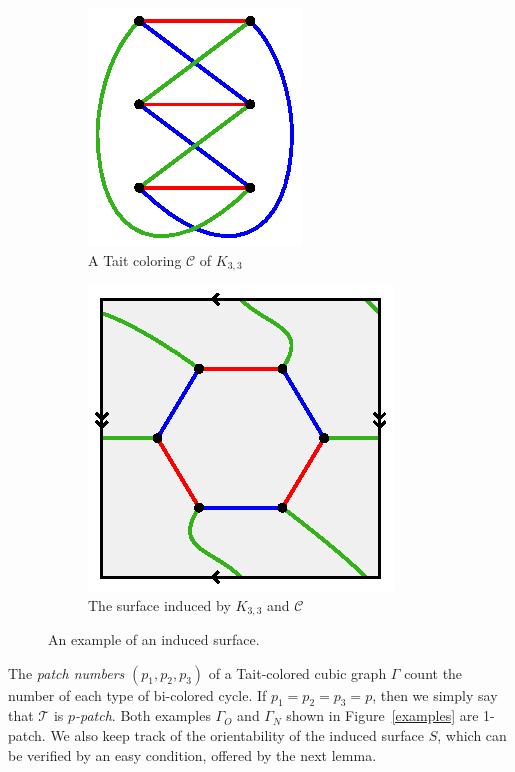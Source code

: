 \documentclass[11pt, oneside]{amsart}
\theoremstyle{theorem}
\theoremstyle{definition}
\newcommand{\T}{\mathcal{T}}
\theoremstyle{theorem}
\begin{document}
\begin{figure}[h!]
\begin{subfigure}{.5\textwidth}
  \centering
  \includegraphics[width=.6\linewidth]{ex1a.eps}
  \caption{A Tait coloring $\mathcal{C}$ of $K_{3,3}$}
  \label{example1a}
\end{subfigure}%
\begin{subfigure}{.5\textwidth}
  \centering
  \includegraphics[width=.6\linewidth]{ex1b.eps}
  \caption{The surface induced by $K_{3,3}$ and $\mathcal{C}$}
  \label{example1b}
\end{subfigure}
\caption{An example of an induced surface.}
\label{example1ab}
\end{figure}

The \emph{patch numbers} $(p_1,p_2,p_3)$ of a Tait-colored cubic graph $\Gamma$ count the number of each type of bi-colored cycle.  If $p_1 = p_2 = p_3=p$, then we simply say that $\T$ is \emph{$p$-patch}.  Both examples $\Gamma_O$ and $\Gamma_N$ shown in Figure~\ref{examples} are 1-patch.  We also keep track of the orientability of the induced surface $S$, which can be verified by an easy condition, offered by the next lemma.
\end{document}
